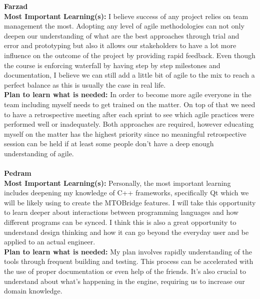\documentclass[12pt]{article}
\begin{document}
\noindent\textbf{Farzad}\\
\textbf{Most Important Learning(s):} I believe success of any project relies on team management the most. Adopting any level of agile methodologies can not only deepen 
our understanding of what are the best approaches through trial and error and prototyping but also it allows our stakeholders to have a lot more influence on the outcome 
of the project by providing rapid feedback. Even though the course is enforcing waterfall by having step by step milestones and documentation, I believe we can still add 
a little bit of agile to the mix to reach a perfect balance as this is usually the case in real life.\\
\textbf{Plan to learn what is needed:} In order to become more agile everyone in the team including myself needs to get trained on the matter. On top of that we need to 
have a retrospective meeting after each sprint to see which agile practices were performed well or inadequately. Both approaches are required, however educating myself on 
the matter has the highest priority since no meaningful retrospective session can be held if at least some people don't have a deep enough understanding of agile.\\\\

\noindent\textbf{Pedram}\\
\textbf{Most Important Learning(s):} Personally, the most important learning includes deepening my knowledge of C++ frameworks, specifically Qt which we will be likely 
using to create the MTOBridge features. I will take this opportunity to learn deeper about interactions between programming languages and how different programs can be 
synced. I think this is also a great opportunity to understand design thinking and how it can go beyond the everyday user and be applied to an actual engineer. \\
\textbf{Plan to learn what is needed:} My plan involves rapidly understanding of the tools through frequent building and testing. This process can be accelerated with the 
use of proper documentation or even help of the friends. It's also crucial to understand about what's happening in the engine, requiring us to increase our domain knowledge. \\\\
\end{document}
